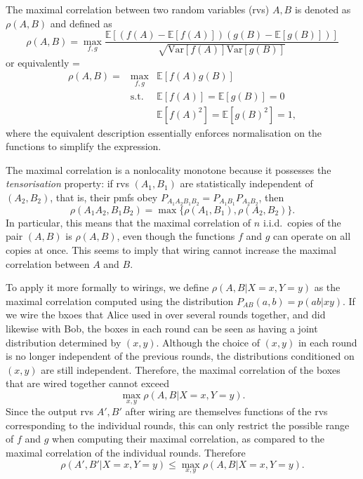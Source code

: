 \documentclass[10pt, a4paper]{article}
\numberwithin{equation}{section} %
\theoremstyle{definition}
\theoremstyle{plain}
\newenvironment{Array}[1] %
{\def\arraystretch{1.75}\everymath={\displaystyle}\begin{equation}\begin{array}{#1}}
{\end{array}\end{equation}}
\newcommand{\?}{\mathrel{?}} %
\newcommand{\E}{\mathbb{E}} %
\newcommand{\Var}{\mathrm{Var}} %
\begin{document}
    The maximal correlation between two random variables (rvs) \(A,B\) is denoted as \(\rho(A,B)\) and defined as~\cite{NLMonotones}
    \begin{equation}
      \rho(A,B) = \max_{f,g} \frac{\E[(f(A)-\E[f(A)])(g(B)-\E[g(B)])]}{\sqrt{\Var[f(A)]\Var[g(B)]}}
    \end{equation}
    or equivalently
    \begin{Array}{rcl}
      \rho(A,B) = & \max_{f,g}  & \E[f(A)g(B)] \\
                  & \text{s.t.} & \E[f(A)] = \E[g(B)] = 0 \\
                  &             & \E[f(A)^2] = \E[g(B)^2] = 1,
    \end{Array}
    where the equivalent description essentially enforces normalisation on the functions to simplify the expression.

    The maximal correlation is a nonlocality monotone because it possesses the \emph{tensorisation} property: if rvs \((A_1, B_1)\) are statistically independent of \((A_2,B_2)\), that is, their pmfs obey \(P_{A_1A_2B_1B_2} = P_{A_1B_1}P_{A_2B_2}\), then
    \begin{equation}
      \rho(A_1A_2,B_1B_2) = \max\{ \rho(A_1,B_1), \rho(A_2,B_2) \}.
    \end{equation}
    In particular, this means that the maximal correlation of \(n\) i.i.d.\ copies of the pair \((A,B)\) is \(\rho(A,B)\), even though the functions \(f\) and \(g\) can operate on all copies at once. This seems to imply that wiring cannot increase the maximal correlation between \(A\) and \(B\).

    To apply it more formally to wirings, we define \(\rho(A,B|X=x,Y=y)\) as the maximal correlation computed using the distribution \(P_{AB}(a,b) = p(ab|xy)\). If we wire the bxoes that Alice used in over several rounds together, and did likewise with Bob, the boxes in each round can be seen as having a joint distribution determined by \((x,y)\). Although the choice of \((x,y)\) in each round is no longer independent of the previous rounds, the distributions conditioned on \((x,y)\) are still independent. Therefore, the maximal correlation of the boxes that are wired together cannot exceed
    \[ \max_{x,y} \rho(A,B|X=x,Y=y). \]
    Since the output rvs \(A', B'\) after wiring are themselves functions of the rvs corresponding to the individual rounds, this can only restrict the possible range of \(f\) and \(g\) when computing their maximal correlation, as compared to the maximal correlation of the individual rounds. Therefore
    \[ \rho(A',B'|X=x,Y=y) \leq \max_{x,y} \rho(A,B|X=x,Y=y). \]
\end{document}
